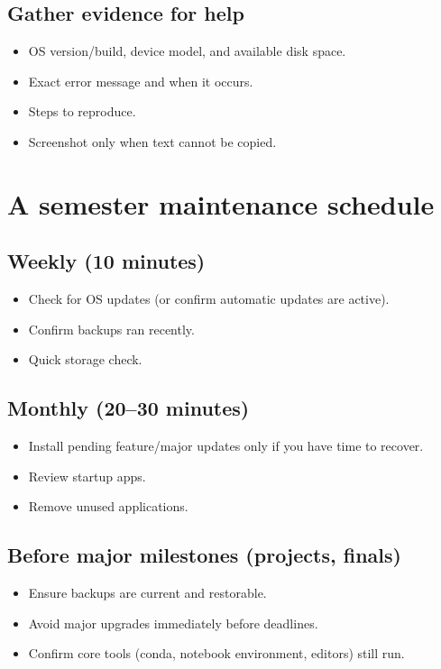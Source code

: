 \subsection{Gather evidence for help}
\begin{itemize}
\item OS version/build, device model, and available disk space.
\item Exact error message and when it occurs.
\item Steps to reproduce.
\item Screenshot only when text cannot be copied.
\end{itemize}

\section{A semester maintenance schedule}
\subsection{Weekly (10 minutes)}
\begin{itemize}
\item Check for OS updates (or confirm automatic updates are active).
\item Confirm backups ran recently.
\item Quick storage check.
\end{itemize}

\subsection{Monthly (20–30 minutes)}
\begin{itemize}
\item Install pending feature/major updates only if you have time to recover.
\item Review startup apps.
\item Remove unused applications.
\end{itemize}

\subsection{Before major milestones (projects, finals)}
\begin{itemize}
\item Ensure backups are current and restorable.
\item Avoid major upgrades immediately before deadlines.
\item Confirm core tools (conda, notebook environment, editors) still run.
\end{itemize}

